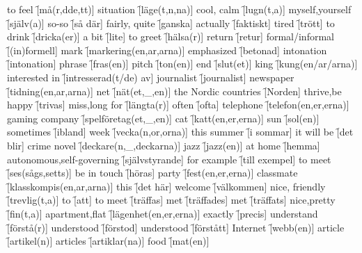 \begin{questions}
    \begin{multicols}{2}
        \raggedcolumns
        \question to feel \f[må(r,dde,tt)]
        \question situation \f[läge(t,n,na)]
        \question cool, calm \f[lugn(t,a)]
        \question myself,yourself \f[själv(a)]
        \question so-so \f[så där]
        \question fairly, quite \f[ganska]
        \question actually \f[faktiskt]
        \question tired \f[trött]
        \question to drink \f[dricka(er)]
        \question a bit \f[lite]
        \question to greet \f[hälsa(r)]
        \question return \f[retur]
        \question formal/informal \f[(in)formell]
        \question mark \f[markering(en,ar,arna)]
        \question emphasized \f[betonad]
        \question intonation \f[intonation]
        \question phrase \f[fras(en)]
        \question pitch \f[ton(en)]
        \question end \f[slut(et)]
        \question king \f[kung(en/ar/arna)]
        \question interested in \f[intresserad(t/de) av]
        \question journalist \f[journalist]
        \question newspaper \f[tidning(en,ar,arna)]
        \question net \f [nät(et,\_,en)]
        \question the Nordic countries \f[Norden]
        \question thrive,be happy \f[trivas]
        \question miss,long for \f[längta(r)]
        \question often \f[ofta]
        \question telephone \f[telefon(en,er,erna)]
        \question gaming company \f[spelföretag(et,\_,en)]
        \question cat \f[katt(en,er,erna)]
        \question sun \f[sol(en)]
        \question sometimes \f[ibland]
        \question week \f[vecka(n,or,orna)]
        \question this summer \f[i sommar]
        \question it will be \f[det blir]
        \question crime novel \f[deckare(n,\_,deckarna)]
        \question jazz \f[jazz(en)]
        \question at home \f[hemma]
        \question autonomous,self-governing \f[självstyrande]
        \question for example \f[till exempel]
        \question to meet \f[ses(sågs,setts)]
        \question be in touch \f[höras]
        \question party \f[fest(en,er,erna)]
        \question classmate \f[klasskompis(en,ar,arna)]
        \question this \f[det här]
        \question welcome \f[välkommen]
        \question nice, friendly \f[trevlig(t,a)]
        \question to \f[att]
        \question to meet \f[träffas]
        \question met \f[träffades]
        \question met \f[träffats]
        \question nice,pretty \f[fin(t,a)]
        \question apartment,flat \f[lägenhet(en,er,erna)]
        \question exactly \f[precis]
        \question understand \f[förstå(r)]
        \question understood \f[förstod]
        \question understood \f[förstått]
        \question Internet \f[webb(en)]
        \question article \f[artikel(n)]
        \question articles \f[artiklar(na)]
        \question food \f[mat(en)]
    \end{multicols}
\end{questions}
